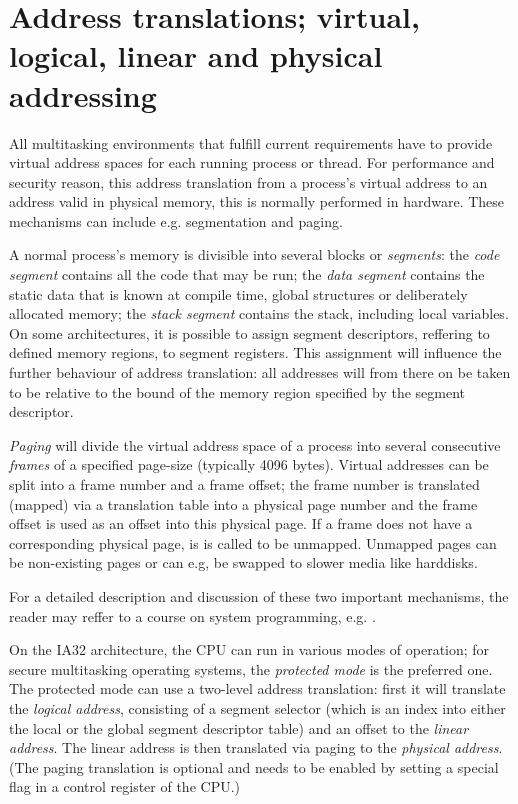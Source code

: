 %
%

\section{Address translations; virtual, logical, linear and physical addressing}
\label{address_translation}

All multitasking environments that fulfill current requirements have to provide
virtual address spaces for each running process or thread. For performance and
security reason, this address translation from a process's virtual address to an
address valid in physical memory, this is normally performed in hardware.  These
mechanisms can include e.g. segmentation and paging.

A normal process's memory is divisible into several blocks or \emph{segments}:
the \emph{code segment} contains all the code that may be run; the \emph{data
segment} contains the static data that is known at compile time, global
structures or deliberately allocated memory; the \emph{stack segment} contains
the stack, including local variables.  On some architectures, it is possible to
assign segment descriptors, reffering to defined memory regions, to segment
registers.  This assignment will influence the further behaviour of address
translation: all addresses will from there on be taken to be relative to the
bound of the memory region specified by the segment descriptor.

\emph{Paging} will divide the virtual address space of a process into several
consecutive \emph{frames} of a specified page-size (typically 4096 bytes).
Virtual addresses can be split into a frame number and a frame offset; the frame
number is translated (mapped) via a translation table into a physical page
number and the frame offset is used as an offset into this physical page. If a
frame does not have a corresponding physical page, is is called to be unmapped.
Unmapped pages can be non-existing pages or can e.g, be swapped to slower media
like harddisks.

For a detailed description and discussion of these two important mechanisms, the
reader may reffer to a course on system programming, e.g.
\cite{rwth_syspro_scriptum:2002}.

On the IA32 architecture, the CPU can run in various modes of operation; for
secure multitasking operating systems, the \emph{protected mode} is the
preferred one.  The protected mode can use a two-level address translation:
first it will translate the \emph {logical address}, consisting of a segment
selector (which is an index into either the local or the global segment
descriptor table) and an offset to the \emph{linear address}.  The linear
address is then translated via paging to the \emph{physical address}. (The
paging translation is optional and needs to be enabled by setting a special flag
in a control register of the CPU.)

